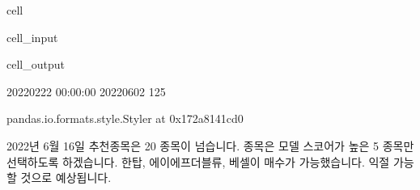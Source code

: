 \documentclass[letterpaper,10pt,english]{jupyterBook}
\begin{document}
\begin{sphinxuseclass}{cell}\begin{sphinxVerbatimInput}

\begin{sphinxuseclass}{cell_input}
\begin{sphinxVerbatim}[commandchars=\\\{\}]
  

    
         
    
\end{sphinxVerbatim}

\end{sphinxuseclass}\end{sphinxVerbatimInput}
\begin{sphinxVerbatimOutput}

\begin{sphinxuseclass}{cell_output}
\begin{sphinxVerbatim}[commandchars=\\\{\}]
2022\PYGZhy{}02\PYGZhy{}22 00:00:00 2022\PYGZhy{}06\PYGZhy{}02
125
\end{sphinxVerbatim}

\begin{sphinxVerbatim}[commandchars=\\\{\}]
\PYGZlt{}pandas.io.formats.style.Styler at 0x172a8141cd0\PYGZgt{}
\end{sphinxVerbatim}

\end{sphinxuseclass}\end{sphinxVerbatimOutput}

\end{sphinxuseclass}
\sphinxAtStartPar
 2022년 6월 16일 추천종목은 20 종목이 넘습니다. 종목은 모델 스코어가 높은 5 종목만 선택하도록 하겠습니다. 한탑, 에이에프더블류, 베셀이 매수가 가능했습니다. 익절 가능할 것으로 예상됩니다.
\end{document}
